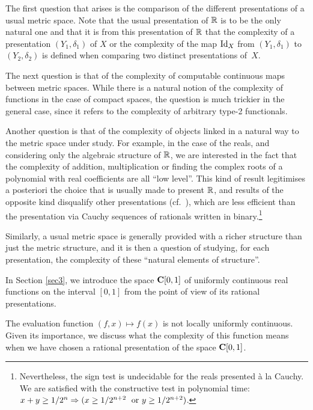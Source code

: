 \smallskip The first question that arises is the comparison of the different presentations of a usual metric space. 
Note that the usual presentation of $\mathbb {R}$ is  to be the only natural one and that it is from this presentation of $\mathbb {R}$ that the complexity of a presentation $(Y_1, \delta_1)$ of $X$ or the complexity of the map ${\rm Id}_X$ from $(Y_1, \delta_1)$ to $(Y_2, \delta_2)$ is defined when comparing two distinct presentations of~$X$.

\smallskip The next question is that of the complexity of computable  continuous maps between metric spaces. 
While there is a natural notion of the complexity of functions in the case of compact spaces, the question is much trickier in the general case, since it refers to the complexity of arbitrary type-2 functionals.
 
\smallskip Another question is that of the complexity of objects linked in a natural way to the metric space under study. 
For example, in the case of the reals, and considering only the algebraic structure of $\mathbb {R}$, we are interested in the fact that the complexity of addition, multiplication or finding the complex roots of a polynomial with real coefficients are all ``low level''. 
This kind of result legitimises a posteriori the choice that is usually made to present $\mathbb {R}$, and results of the opposite kind disqualify other presentations (cf.\ \cite{LL}), which are less efficient than the presentation via Cauchy sequences of rationals written in binary.\footnote{Nevertheless, the sign test is undecidable for the reals presented à la Cauchy. 
We are satisfied with the constructive test in polynomial time: $x + y \geq 1/2^n \Rightarrow ( x \geq 1/2^{n+2} \;\hbox{ or }y \geq 1/2^{n+2} )$.}
 
Similarly, a usual metric space is generally provided with a richer structure than just the metric structure, and it is then a question of studying, for each presentation, the complexity of these ``natural elements of structure''.


\medskip 
In Section \ref{sec3}, we introduce the space ${{\bf C}[0,1]}$ of uniformly continuous real functions on the interval $[0,1]$ from the point of view of its rational presentations.
 
The evaluation function $(f, x) \mapsto f(x)$ is not locally uniformly continuous. 
Given its importance, we discuss what the complexity of this function means when we have chosen a rational presentation of the space ${{\bf C}[0,1]}$. 

